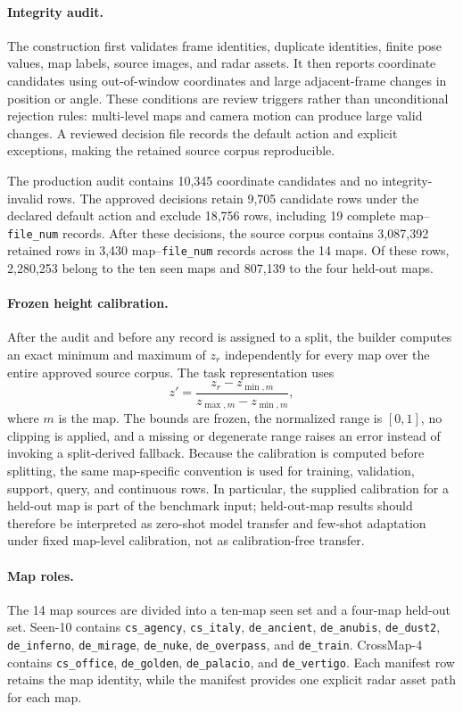 \paragraph{Integrity audit.}
The construction first validates frame identities, duplicate identities,
finite pose values, map labels, source images, and radar assets.  It then
reports coordinate candidates using out-of-window coordinates and large
adjacent-frame changes in position or angle.  These conditions are review
triggers rather than unconditional rejection rules: multi-level maps and
camera motion can produce large valid changes.  A reviewed decision file
records the default action and explicit exceptions, making the retained
source corpus reproducible.

The production audit contains 10,345 coordinate candidates and no
integrity-invalid rows.  The approved decisions retain 9,705 candidate rows
under the declared default action and exclude 18,756 rows, including 19
complete map--\texttt{file\_num} records.  After these decisions, the source
corpus contains 3,087,392 retained rows in 3,430
map--\texttt{file\_num} records across the
14 maps.  Of these rows, 2,280,253 belong to the ten seen maps and 807,139 to
the four held-out maps.

\paragraph{Frozen height calibration.}
After the audit and before any record is assigned to a split, the builder
computes an exact minimum and maximum of $z_r$ independently for every map
over the entire approved source corpus.  The task representation uses
\begin{equation}
    z' = \frac{z_r-z_{\min,m}}{z_{\max,m}-z_{\min,m}},
\end{equation}
where $m$ is the map.  The bounds are frozen, the normalized range is
$[0,1]$, no clipping is applied, and a missing or degenerate range raises an
error instead of invoking a split-derived fallback.  Because the calibration
is computed before splitting, the same map-specific convention is used for
training, validation, support, query, and continuous rows.  In particular,
the supplied calibration for a held-out map is part of the benchmark input;
held-out-map results should therefore be interpreted as zero-shot model
transfer and few-shot adaptation under fixed map-level calibration, not as
calibration-free transfer.

\paragraph{Map roles.}
The 14 map sources are divided into a ten-map seen set and a four-map
held-out set.  Seen-10 contains
\texttt{cs\_agency}, \texttt{cs\_italy}, \texttt{de\_ancient},
\texttt{de\_anubis}, \texttt{de\_dust2}, \texttt{de\_inferno},
\texttt{de\_mirage}, \texttt{de\_nuke}, \texttt{de\_overpass}, and
\texttt{de\_train}.  CrossMap-4 contains \texttt{cs\_office},
\texttt{de\_golden}, \texttt{de\_palacio}, and \texttt{de\_vertigo}.
Each manifest row retains the map identity, while the manifest provides one
explicit radar asset path for each map.

